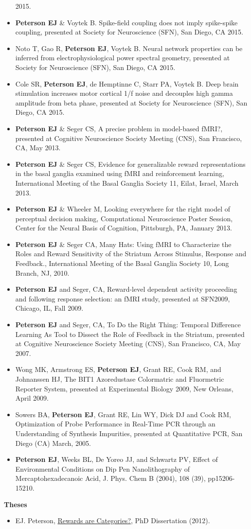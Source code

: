 \begin{itemize}
  2015.
\item
  \textbf{Peterson EJ} \& Voytek B. Spike-field coupling does not imply
  spike-spike coupling, presented at Society for Neuroscience (SFN), San
  Diego, CA 2015.
\item
  Noto T, Gao R, \textbf{Peterson EJ}, Voytek B. Neural network
  properties can be inferred from electrophysiological power spectral
  geometry, presented at Society for Neuroscience (SFN), San Diego, CA
  2015.
\item
  Cole SR, \textbf{Peterson EJ}, de Hemptinne C, Starr PA, Voytek B.
  Deep brain stimulation increases motor cortical 1/f noise and
  decouples high gamma amplitude from beta phase, presented at Society
  for Neuroscience (SFN), San Diego, CA 2015.
\item
  \textbf{Peterson EJ} \& Seger CS, A precise problem in model-based
  fMRI?, presented at Cognitive Neuroscience Society Meeting (CNS), San
  Francisco, CA, May 2013.
\item
  \textbf{Peterson EJ} \& Seger CS, Evidence for generalizable reward
  representations in the basal ganglia examined using fMRI and
  reinforcement learning, International Meeting of the Basal Ganglia
  Society 11, Eilat, Israel, March 2013.
\item
  \textbf{Peterson EJ} \& Wheeler M, Looking everywhere for the right
  model of perceptual decision making, Computational Neuroscience Poster
  Session, Center for the Neural Basis of Cognition, Pittsburgh, PA,
  January 2013.
\item
  \textbf{Peterson EJ} \& Seger CA, Many Hats: Using fMRI to
  Characterize the Roles and Reward Sensitivity of the Striatum Across
  Stimulus, Response and Feedback., International Meeting of the Basal
  Ganglia Society 10, Long Branch, NJ, 2010.
\item
  \textbf{Peterson EJ} and Seger, CA, Reward-level dependent activity
  proceeding and following response selection: an fMRI study, presented
  at SFN2009, Chicago, IL, Fall 2009.
\item
  \textbf{Peterson EJ} and Seger, CA, To Do the Right Thing: Temporal
  Difference Learning As Tool to Dissect the Role of Feedback in the
  Striatum, presented at Cognitive Neuroscience Society Meeting (CNS),
  San Francisco, CA, May 2007.
\item
  Wong MK, Armstrong ES, \textbf{Peterson EJ}, Grant RE, Cook RM, and
  Johnanssen HJ, The BIT1 Azoredustase Colormatric and Fluormetric
  Reporter System, presented at Experimental Biology 2009, New Orleans,
  April 2009.
\item
  Sowers BA, \textbf{Peterson EJ}, Grant RE, Lin WY, Dick DJ and Cook
  RM, Optimization of Probe Performance in Real-Time PCR through an
  Understanding of Synthesis Impurities, presented at Quantitative PCR,
  San Diego (CA) March, 2005.
\item
  \textbf{Peterson EJ}, Weeks BL, De Yoreo JJ, and Schwartz PV, Effect
  of Environmental Conditions on Dip Pen Nanolithography of
  Mercaptohexadecanoic Acid, J. Phys. Chem B (2004), 108 (39),
  pp15206-15210.
\end{itemize}

\textbf{Theses}

\begin{itemize}
\tightlist
\item
  EJ. Peterson,
  \href{https://github.com/parenthetical-e/dissertation}{Rewards are
  Categories?}, PhD Dissertation (2012).
\end{itemize}
